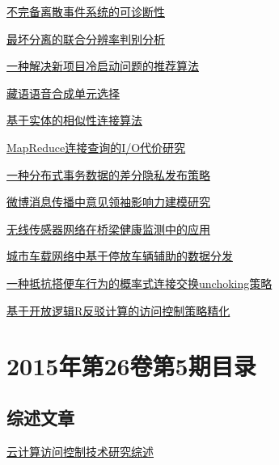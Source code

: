 \documentclass[a4paper]{article}
\begin{document}
\href{http://www.jos.org.cn/ch/reader/download_pdf.aspx?file_no=4585&year_id=2015&quarter_id=6&falg=1}{不完备离散事件系统的可诊断性}

\href{http://www.jos.org.cn/ch/reader/download_pdf.aspx?file_no=4593&year_id=2015&quarter_id=6&falg=1}{最坏分离的联合分辨率判别分析}

\href{http://www.jos.org.cn/ch/reader/download_pdf.aspx?file_no=4587&year_id=2015&quarter_id=6&falg=1}{一种解决新项目冷启动问题的推荐算法}

\href{http://www.jos.org.cn/ch/reader/download_pdf.aspx?file_no=4597&year_id=2015&quarter_id=6&falg=1}{藏语语音合成单元选择}

\href{http://www.jos.org.cn/ch/reader/download_pdf.aspx?file_no=4610&year_id=2015&quarter_id=6&falg=1}{基于实体的相似性连接算法}

\href{http://www.jos.org.cn/ch/reader/download_pdf.aspx?file_no=4586&year_id=2015&quarter_id=6&falg=1}{MapReduce连接查询的I/O代价研究}

\href{http://www.jos.org.cn/ch/reader/download_pdf.aspx?file_no=4576&year_id=2015&quarter_id=6&falg=1}{一种分布式事务数据的差分隐私发布策略}

\href{http://www.jos.org.cn/ch/reader/download_pdf.aspx?file_no=4627&year_id=2015&quarter_id=6&falg=1}{微博消息传播中意见领袖影响力建模研究}

\href{http://www.jos.org.cn/ch/reader/download_pdf.aspx?file_no=4580&year_id=2015&quarter_id=6&falg=1}{无线传感器网络在桥梁健康监测中的应用}

\href{http://www.jos.org.cn/ch/reader/download_pdf.aspx?file_no=4591&year_id=2015&quarter_id=6&falg=1}{城市车载网络中基于停放车辆辅助的数据分发}

\href{http://www.jos.org.cn/ch/reader/download_pdf.aspx?file_no=4625&year_id=2015&quarter_id=6&falg=1}{一种抵抗搭便车行为的概率式连接交换unchoking策略}

\href{http://www.jos.org.cn/ch/reader/download_pdf.aspx?file_no=4626&year_id=2015&quarter_id=6&falg=1}{基于开放逻辑R反驳计算的访问控制策略精化}


\section{\textbf{2015年第26卷第5期目录}}
\subsection{综述文章}
\href{http://www.jos.org.cn/ch/reader/download_pdf.aspx?file_no=4820&year_id=2015&quarter_id=5&falg=1}{云计算访问控制技术研究综述}
\end{document}
